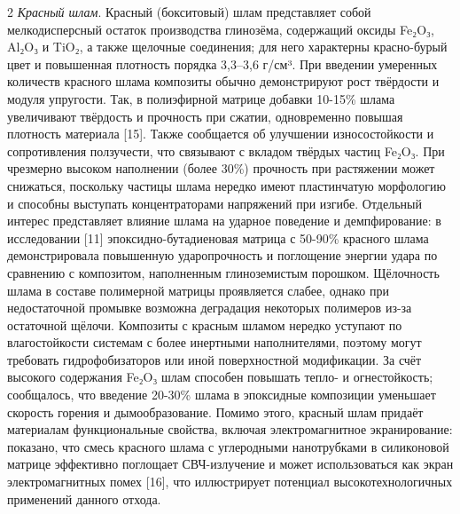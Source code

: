 \begin{multicols}{2}
\emph{Красный шлам}. Красный (бокситовый) шлам представляет
собой мелкодисперсный остаток производства глинозёма, содержащий оксиды
Fe₂O₃, Al₂O₃ и TiO₂, а также щелочные соединения; для него характерны
красно-бурый цвет и повышенная плотность порядка 3,3--3,6 г/см³. При
введении умеренных количеств красного шлама композиты обычно
демонстрируют рост твёрдости и модуля упругости. Так, в полиэфирной
матрице добавки 10-15\% шлама увеличивают твёрдость и прочность при
сжатии, одновременно повышая плотность материала {[}15{]}. Также
сообщается об улучшении износостойкости и сопротивления ползучести, что
связывают с вкладом твёрдых частиц Fe₂O₃. При чрезмерно высоком
наполнении (более 30\%) прочность при растяжении может снижаться,
поскольку частицы шлама нередко имеют пластинчатую морфологию и способны
выступать концентраторами напряжений при изгибе. Отдельный интерес
представляет влияние шлама на ударное поведение и демпфирование: в
исследовании {[}11{]} эпоксидно-бутадиеновая матрица с 50-90\% красного
шлама демонстрировала повышенную ударопрочность и поглощение энергии
удара по сравнению с композитом, наполненным глиноземистым порошком.
Щёлочность шлама в составе полимерной матрицы проявляется слабее, однако
при недостаточной промывке возможна деградация некоторых полимеров из-за
остаточной щёлочи. Композиты с красным шламом нередко уступают по
влагостойкости системам с более инертными наполнителями, поэтому могут
требовать гидрофобизаторов или иной поверхностной модификации. За счёт
высокого содержания Fe₂O₃ шлам способен повышать тепло- и огнестойкость;
сообщалось, что введение 20-30\% шлама в эпоксидные композиции уменьшает
скорость горения и дымообразование. Помимо этого, красный шлам придаёт
материалам функциональные свойства, включая электромагнитное
экранирование: показано, что смесь красного шлама с углеродными
нанотрубками в силиконовой матрице эффективно поглощает СВЧ-излучение и
может использоваться как экран электромагнитных помех {[}16{]}, что
иллюстрирует потенциал высокотехнологичных применений данного отхода.


\end{multicols}
